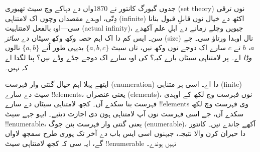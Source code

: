 \documentclass[../../../include/open-logic-section]{subfiles}
\begin{document}


جدوں گیورگ کانتور نے 1870واں دے دہاکے وچ سیٹ تھیوری (set theory) نوں
ترقی دِتّی، اوہدے مقصداں وچوں اک لامتناہی (infinite) اکٹھ دے خیال نوں
قابلِ قبول بنانا سی---اوہ بالفعل لامتناہیت (actual infinity)، جیویں
وچلے زمانے دے اہلِ علم آکھدے سن۔ ایس کم دا اک اہم حصہ وکھ وکھ سیٹاں
دے \emph{سائز} (size) نال اوہدا ورتاؤ سی۔ جے $a$،
$b$ تے $c$ سارے اک دوجے توں وکھ نیں، تاں سیٹ $\{a, b, c\}$ بدیہی
طور اُتے $\{a, b\}$ نالوں \emph{وڈا} اے۔ پر لامتناہی سیٹاں بارے کیہ؟
کی اوہ سارے اک دوجے جڈے وڈے نیں؟ پتا لگدا اے کہ نہیں۔

ایتھے پہلا اہم خیال گنتی وار فہرست (enumeration) دا اے۔ اسی ہر متناہی
(finite) سیٹ دے سارے !!{element}s، یعنی عنصراں (elements)، نوں فہرست
وچ لکھ کے اوہدی فہرست بنا سکدے آں۔ کجھ لامتناہی سیٹاں دے سارے
!!{element}s وی فہرست وچ لکھ سکدے آں، جے اسی فہرست نوں آپ لامتناہی
ہون دی اجازت دیئیے۔ ایہو جہے سیٹ !!{enumerable}، یعنی گنتی وار فہرست
بنن جوگ (enumerable)، آکھے جاندے نیں۔ کانتور دا حیران کرن والا نتیجہ،
جیہنوں اسی ایس باب دے آخر تک پوری طرح سمجھ لاواں گے، ایہ سی کہ کجھ
لامتناہی سیٹ !!{enumerable} نہیں ہوندے۔
\end{document}
